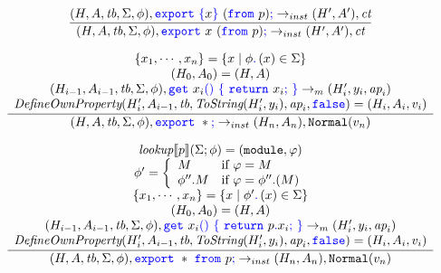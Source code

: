 \documentclass[a4paper]{article}
\newcommand{\code}[1]{\textcolor{blue}{\tt #1}}
\newcommand{\mydot}{.\,}
\newcommand{\module}{{\tt{module}}}
\newcommand{\lookup}{\emph{lookup}}
\newcommand{\If}{\mbox{if}}
\newcommand{\tb}{\emph{tb}}
\newcommand{\ct}{\emph{ct}}
\newcommand{\ap}{\emph{ap}}
\begin{document}
\begin{equation*}
\frac{
    (H, A, \tb, \Sigma, \phi), \code{export}\ \code{\{}x\code{\}}\ (\code{from}\ p)\code{;} \rightarrow_{inst} (H', A'), \ct
}{
    (H, A, \tb, \Sigma, \phi), \code{export}\ x\ (\code{from}\ p)\code{;} \rightarrow_{inst} (H', A'), \ct
}
\end{equation*}

\begin{equation*}
\frac{
    \begin{array}{c}
    \{ x_1, \cdots, x_n \} = \{ x \mid \phi\code{\mydot}(x) \in \Sigma \} \\
    (H_0, A_0) = (H, A) \\
    (H_{i-1}, A_{i-1}, \tb, \Sigma, \phi), \code{get}\ x_i\code{()}\ \code{\{}\ \code{return}\ x_i\code{;}\ \code{\}} \rightarrow_m (H'_i, y_i, \ap_i) \\
    \emph{DefineOwnProperty}(H'_i, A_{i-1}, \tb, \emph{ToString}(H'_i, y_i), \ap_i, \code{false}) = (H_i, A_i, v_i)
    \end{array}
}{
    (H, A, \tb, \Sigma, \phi), \code{export}\ *\code{;} \rightarrow_{inst} (H_n, A_n), \texttt{Normal}(v_n)
}
\end{equation*}

\begin{equation*}
\frac{
    \begin{array}{c}
    \lookup \llbracket p \rrbracket (\Sigma; \phi) = (\module, \varphi) \\
    \phi' = \left\{\begin{array}{ll}
    M & \If\ \varphi = M \\
    \phi''.M & \If\ \varphi = \phi''.(M)
    \end{array}\right. \\
    \{ x_1, \cdots, x_n \} = \{ x \mid \phi'\code{\mydot}(x) \in \Sigma \} \\
    (H_0, A_0) = (H, A) \\
    (H_{i-1}, A_{i-1}, \tb, \Sigma, \phi), \code{get}\ x_i\code{()}\ \code{\{}\ \code{return}\ p\code{.}x_i\code{;}\ \code{\}} \rightarrow_m (H'_i, y_i, \ap_i) \\
    \emph{DefineOwnProperty}(H'_i, A_{i-1}, \tb, \emph{ToString}(H'_i, y_i), \ap_i, \code{false}) = (H_i, A_i, v_i)
    \end{array}
}{
    (H, A, \tb, \Sigma, \phi), \code{export}\ *\ \code{from}\ p\code{;} \rightarrow_{inst} (H_n, A_n), \texttt{Normal}(v_n)
}
\end{equation*}
\end{document}
